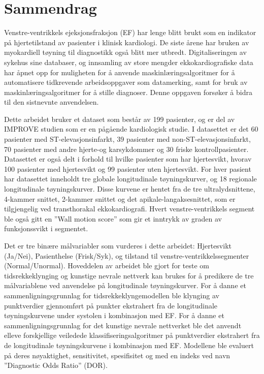 \section*{Sammendrag}
%

Venstre-ventrikkels ejeksjonsfraksjon (EF) har lenge blitt brukt som en indikator på hjertetilstand av pasienter i klinisk kardiologi. De siste årene har bruken av myokardiell tøyning til diagnostikk også blitt mer utbredt. Digitaliseringen av sykehus sine databaser, og innsamling av store mengder ekkokardiografiske data har åpnet opp for muligheten for å anvende maskinlæringsalgoritmer for å automatisere tidkrevende arbeidsoppgaver som datamerking, samt for bruk av maskinlæringsalgoritmer for å stille diagnoser. Denne oppgaven forsøker å bidra til den sistnevnte anvendelsen. \bigskip

Dette arbeidet bruker et dataset som består av 199 pasienter, og er del av IMPROVE studien som er en pågående kardiologisk studie. I datasettet er det 60 pasienter med ST-elevasjonsinfarkt, 39 pasienter med non-ST-elevasjonsinfarkt, 70 pasienter med andre hjerte-og karsykdommer og 30 friske kontrollpasienter. Datasettet er også delt i forhold til hvilke pasienter som har hjertesvikt, hvorav 100 pasienter med hjertesvikt og 99 pasienter uten hjertesvikt. For hver pasient har datasettet inneholdt tre globale longitudinale tøyningskurver, og 18 regionale longitudinale tøyningskurver. Disse kurvene er hentet fra de tre ultralydsnittene, 4-kammer snittet, 2-kammer snittet og det apikale-langaksesnittet, som er tilgjengelig ved  transthorakal ekkokardiografi. Hvert venstre-ventrikkels segment ble også gitt en ''Wall motion score'' som gir et inntrykk av graden av funksjonssvikt i segmentet. \bigskip

Det er tre binære målvariabler som vurderes i dette arbeidet: Hjertesvikt (Ja/Nei), Pasienthelse (Frisk/Syk), og tilstand til venstre-ventrikkelssegmenter (Normal/Unormal). Hoveddelen av arbeidet ble gjort for teste om tidsrekkeklynging og kunstige nevrale nettverk kan brukes for å predikere de tre målvariablene ved anvendelse på longitudinale tøyningskurver. For å danne et sammenligningsgrunnlag for tidsrekkeklyngemodellen ble klynging av punktverdier gjennomført på punkter ekstrahert fra de longitudinale tøyningskurvene under systolen i kombinasjon med EF. For å danne et sammenligningsgrunnlag for det kunstige nevrale nettverket ble det anvendt elleve forskjellige veiledede klassifiseringsalgoritmer på punktverdier ekstrahert fra de longitudinale tøyningskurvene i kombinasjon med EF. Modellene ble evaluert på deres nøyaktighet, sensitivitet, spesifisitet og med en indeks ved navn ''Diagnostic Odds Ratio'' (DOR). \bigskip

